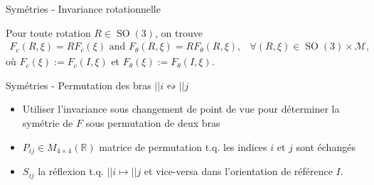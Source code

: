\documentclass[10pt, envcountsect]{beamer}
\theoremstyle{plain}
\newcommand{\M}{\mathcal{M}}
\newcommand{\R}{\mathbb{R}}
\DeclareMathOperator{\SO}{SO}
\begin{document}
\begin{frame}{Symétries - Invariance rotationnelle}

Pour toute rotation $R \in \SO(3)$, on trouve
\begin{eqnarray}
	F_c(R, \xi) = R F_c(\xi) \text { and } F_\theta(R, \xi) = R F_{\theta} (R, \xi),&  \forall (R, \xi) \in \SO(3) \times \M,
\end{eqnarray}
où $F_c(\xi) := F_{c}(I, \xi)$ et $F_{\theta}(\xi) := F_{\theta}(I, \xi)$.

\end{frame}


\begin{frame}{Symétries - Permutation des bras $||i \leftrightsquigarrow ||j$}
\begin{itemize}
\item Utiliser l'invariance sous changement de point de vue pour déterminer la symétrie de $F$ sous permutation de deux bras
\item $P_{ij} \in M_{4 \times 4}(\R)$ matrice de permutation t.q. les indices $i$ et $j$ sont échangés
\item $S_{ij}$ la réflexion t.q. $||i \mapsto ||j$ et vice-versa dans l'orientation de référence $I$.


\end{itemize}
\end{frame}
\end{document}

